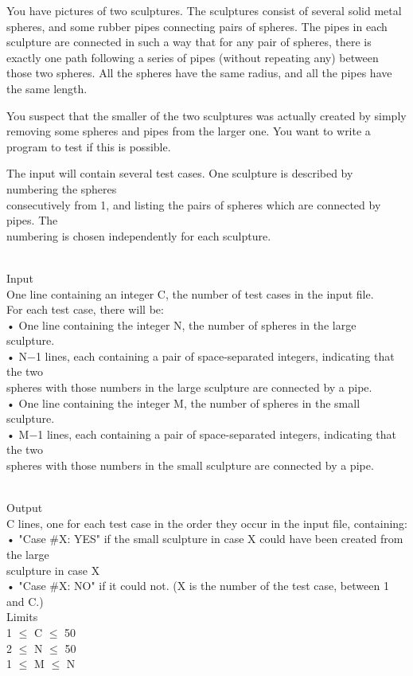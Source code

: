 



   You have pictures of two sculptures. The sculptures consist of several solid metal spheres, and some rubber pipes connecting pairs of spheres. The pipes in each sculpture are connected in such a way that for any pair of spheres, there is exactly one path following a series of pipes (without repeating any) between those two spheres. All the spheres have the same radius, and all the pipes have the same length.  

   You suspect that the smaller of the two sculptures was actually created by simply removing some spheres and pipes from the larger one. You want to write a program to test if this is possible.  

   The input will contain several test cases. One sculpture is described by numbering the spheres   
\\   consecutively from 1, and listing the pairs of spheres which are connected by pipes. The   
\\   numbering is chosen independently for each sculpture.  


\\   Input   
\\   One line containing an integer C, the number of test cases in the input file.   
\\   For each test case, there will be:   
\\   • One line containing the integer N, the number of spheres in the large sculpture.   
\\   • N−1 lines, each containing a pair of space-separated integers, indicating that the two   
\\   spheres with those numbers in the large sculpture are connected by a pipe.   
\\   • One line containing the integer M, the number of spheres in the small sculpture.   
\\   • M−1 lines, each containing a pair of space-separated integers, indicating that the two   
\\   spheres with those numbers in the small sculpture are connected by a pipe.  


\\   Output   
\\   C lines, one for each test case in the order they occur in the input file, containing:   
\\   • "Case \#X: YES" if the small sculpture in case X could have been created from the large   
\\   sculpture in case X   
\\   • "Case \#X: NO" if it could not. (X is the number of the test case, between 1 and C.)   
\\   Limits   
\\   1  $\le$  C  $\le$  50   
\\   2  $\le$  N  $\le$  50   
\\   1  $\le$  M  $\le$  N  

